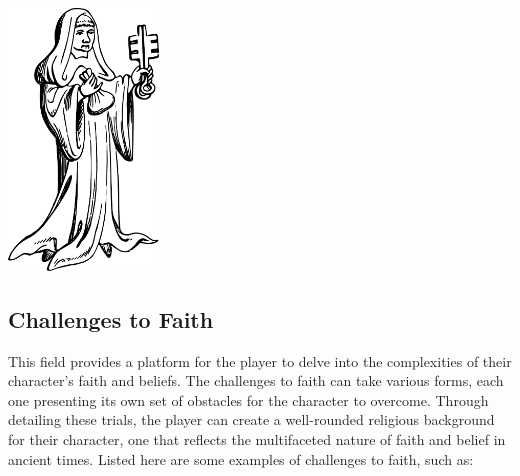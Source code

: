 \documentclass[12pt]{book}  %
\begin{document}
\begin{center}
    \includegraphics[width=0.3\textwidth]{./images/religion05.pdf}
\end{center}

\subsection{\textbf{Challenges to Faith}}

This field provides a platform for the player to delve into the complexities of their character's faith and beliefs. The challenges to faith can take various forms, each one presenting its own set of obstacles for the character to overcome. Through detailing these trials, the player can create a well-rounded religious background for their character, one that reflects the multifaceted nature of faith and belief in ancient times. Listed here are some examples of challenges to faith, such as:
\end{document}
